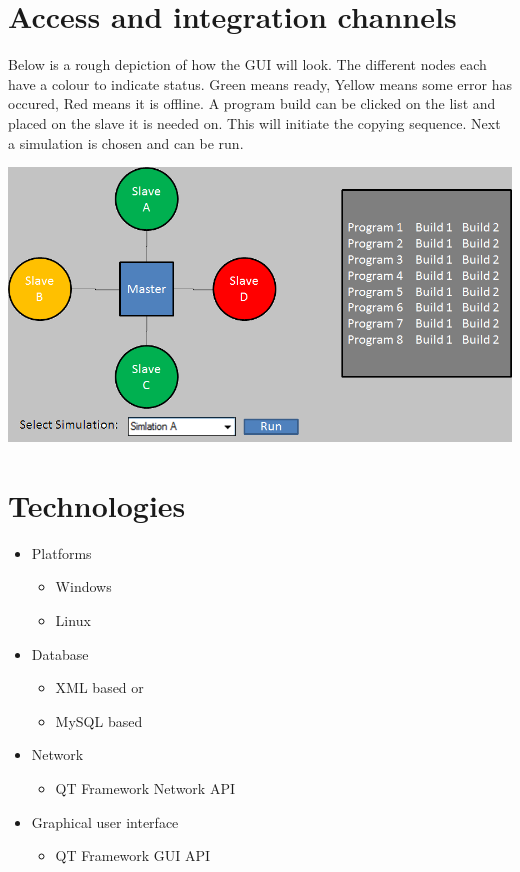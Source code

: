 \documentclass[a4paper,12pt,final]{article}
\begin{document}
\section{Access and integration channels}
Below is a rough depiction of how the GUI will look. The different nodes each have a colour to indicate status. Green means ready, Yellow means some error has occured, Red means it is offline. A program build can be clicked on the list and placed on the slave it is needed on. This will initiate the copying sequence. Next a simulation is chosen and can be run.\\
\begin{center}
  	\includegraphics[scale=0.65]{GuiPlan.png} 
  \end{center}
\section{Technologies}

\begin{itemize}

\item{Platforms}
\begin{itemize}
\item{Windows}
\item{Linux}
\end{itemize}


\item{Database}
\begin{itemize}
\item{XML based or}
\item{MySQL based}
\end{itemize}


\item{Network}
\begin{itemize}
\item{QT Framework Network API}
\end{itemize}


\item{Graphical user interface}
\begin{itemize}
\item{QT Framework GUI API}
\end{itemize}

\end{itemize}
\end{document}
